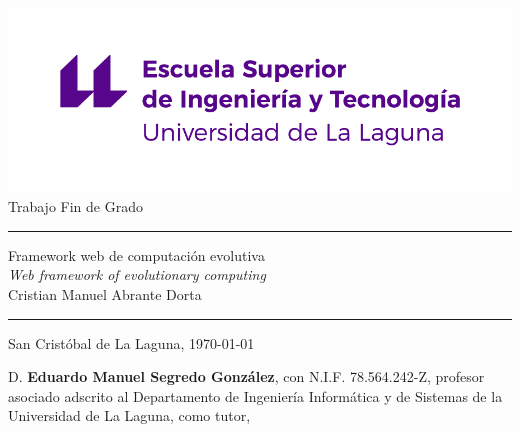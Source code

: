 \documentclass[spanish,a4paper,12pt,oneside]{extreport}
\begin{document}

\pagestyle{empty}
\thispagestyle{empty}


\newcommand{\HRule}{\rule{\linewidth}{1mm}}
\setlength{\parindent}{0mm}
\setlength{\parskip}{0mm}


\begin{center}
    \includegraphics[scale=0.8]{images/etsit-logo.png}\\[10mm]
    {\Huge Trabajo Fin de Grado}
\end{center}

\HRule
\begin{flushright}
        {\Huge Framework web de computación evolutiva} \\[2.5mm]
        {\Large \textit{Web framework of evolutionary computing}} \\[5mm]
        {\Large Cristian Manuel Abrante Dorta} \\[5mm]


\end{flushright}
\HRule
{}
\begin{center}
  \Large San Cristóbal de La Laguna, \today
\end{center}

\setlength{\parindent}{5mm}

\newpage
\thispagestyle{empty}

D. {\bf Eduardo Manuel Segredo González}, con N.I.F. 78.564.242-Z,
profesor asociado adscrito al Departamento de Ingeniería Informática y de Sistemas
de la Universidad de La Laguna, como tutor,
\end{document}
